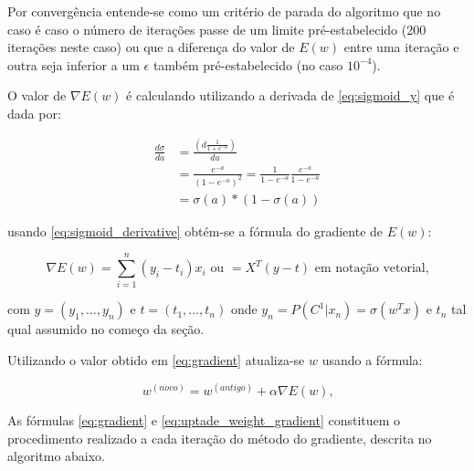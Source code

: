 Por convergência entende-se como um critério de parada do algoritmo que no caso é caso o número de
iterações passe de um limite pré-estabelecido (200 iterações neste caso) ou que a diferença do valor
de $E(w)$ entre uma iteração e outra seja inferior a um $\epsilon$ também pré-estabelecido (no caso
$10^{-4}$).

O valor de $\nabla E(w)$ é calculando utilizando a derivada de \ref{eq:sigmoid_y} que é dada
por:

\begin{center}
	\begin{equation}
		\begin{split}
		\label{eq:sigmoid_derivative}
			\frac{d \sigma}{d a} &= \frac{\left(d \frac{1}{1 + e^{-a}}\right)}{d a} \\
				& = \frac{e^{-a}}{(1 - e^{-a})^2} = \frac{1}{1 - e^{-a}}\frac{e^{-a}}{1 - e^{-a}} \\
				& = \sigma(a)*(1 - \sigma(a))
		\end{split}
	\end{equation}
\end{center}
usando \ref{eq:sigmoid_derivative} obtém-se a fórmula do gradiente de $E(w)$:

\begin{center}
	\begin{equation}\label{eq:gradient}
		\nabla E(w) = \sum_{i =  1}^{n}(y_i - t_i)x_i \text{ ou } = X^T(y - t) \text{ em notação vetorial,}
	\end{equation}
\end{center}
com $y = (y_1, \ldots, y_n)$ e $t = (t_1, \ldots, t_n)$ onde
$y_n = P(C^1 | x_n) = \sigma(w^Tx)$ e $t_n$ tal qual assumido no começo da seção.

Utilizando o valor obtido em \ref{eq:gradient} atualiza-se $w$ usando a fórmula:

\begin{center}
	\begin{equation}
		\label{eq:uptade_weight_gradient}
		w^{ ( novo )} = w^{ (antigo) }  + \alpha \nabla E(w)\text{,}
	\end{equation}
\end{center}

As fórmulas \ref{eq:gradient} e \ref{eq:uptade_weight_gradient} constituem o procedimento
realizado a cada iteração do método do gradiente, descrita no algoritmo abaixo.

